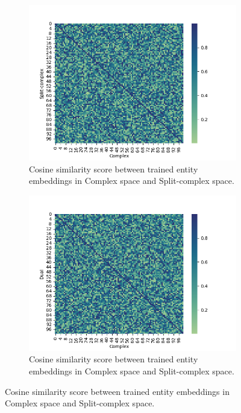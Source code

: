 \documentclass[letterpaper]{article} %
\begin{document}
\begin{figure}
     \centering
     \begin{subfigure}[b]{0.48\textwidth}
         \centering
          \includegraphics[width=\textwidth]{complex_split.png}
         \caption{Cosine similarity score between trained entity embeddings in Complex space and Split-complex space.}
         \label{fig:complex_split}
     \end{subfigure}
     \hfill
     \begin{subfigure}[b]{0.48\textwidth}
         \centering
        \includegraphics[width=\textwidth]{complex_dual.png}
         \caption{Cosine similarity score between trained entity embeddings in Complex space and Split-complex space.}

\end{subfigure}
\end{figure}
\end{document}
